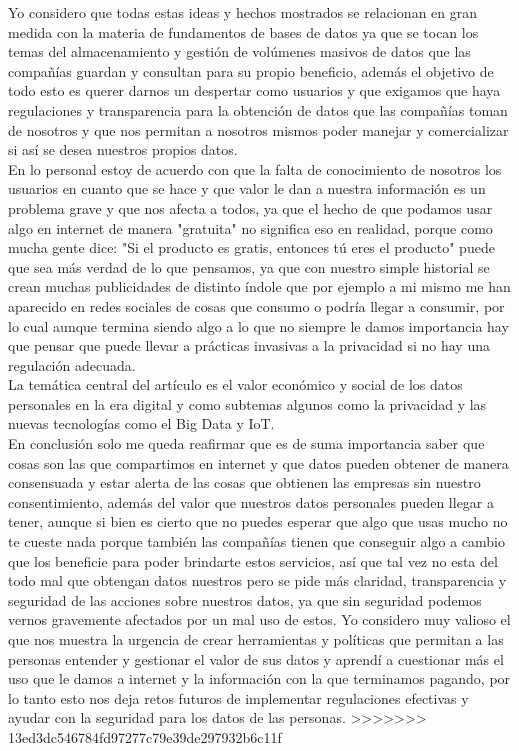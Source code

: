 \documentclass[12pt]{report}
\begin{document}
\begin{enumerate}[label=\textbf{\arabic*.}, leftmargin=*]
\begin{enumerate}[label=\textbf{\alph*.}, leftmargin=*, itemsep=1.0em]
Yo considero que todas estas ideas y hechos mostrados se relacionan en gran medida con la materia de fundamentos de bases de datos ya que se tocan los temas del almacenamiento y gestión de volúmenes masivos de datos que las compañías guardan y consultan para su propio beneficio, además el objetivo de todo esto es querer darnos un despertar como usuarios y que exigamos que haya regulaciones y transparencia para la obtención de datos que las compañías toman de nosotros y que nos permitan a nosotros mismos poder manejar y comercializar si así se desea nuestros propios datos.\\
En lo personal estoy de acuerdo con que la falta de conocimiento de nosotros los usuarios en cuanto que se hace y que valor le dan a nuestra información es un problema grave y que nos afecta a todos, ya que el hecho de que podamos usar algo en internet de manera "gratuita" no significa eso en realidad, porque como mucha gente dice: "Si el producto es gratis, entonces tú eres el producto" puede que sea más verdad de lo que pensamos, ya que con nuestro simple historial se crean muchas publicidades de distinto índole que por ejemplo a mi mismo me han aparecido en redes sociales de cosas que consumo o podría llegar a consumir, por lo cual aunque termina siendo algo a lo que no siempre le damos importancia hay que pensar que puede llevar a prácticas invasivas a la privacidad si no hay una regulación adecuada.\\
La temática central del artículo es el valor económico y social de los datos personales en la era digital y como subtemas algunos como la privacidad y las nuevas tecnologías como el Big Data y IoT.\\

En conclusión solo me queda reafirmar que es de suma importancia saber que cosas son las que compartimos en internet y que datos pueden obtener de manera consensuada y estar alerta de las cosas que obtienen las empresas sin nuestro consentimiento, además del valor que nuestros datos personales pueden llegar a tener, aunque si bien es cierto que no puedes esperar que algo que usas mucho no te cueste nada porque también las compañías tienen que conseguir algo a cambio que los beneficie para poder brindarte estos servicios, así que tal vez no esta del todo mal que obtengan datos nuestros pero se pide más claridad, transparencia y seguridad de las acciones sobre nuestros datos, ya que sin seguridad podemos vernos gravemente afectados por un mal uso de estos. Yo considero muy valioso el que nos muestra la urgencia de crear herramientas y políticas que permitan a las personas entender y gestionar el valor de sus datos y aprendí a cuestionar más el uso que le damos a internet y la información con la que terminamos pagando, por lo tanto esto nos deja retos futuros de implementar regulaciones efectivas y ayudar con la seguridad para los datos de las personas.
>>>>>>> 13ed3dc546784fd97277c79e39de297932b6c11f
\end{enumerate}




\end{enumerate}
\end{document}
